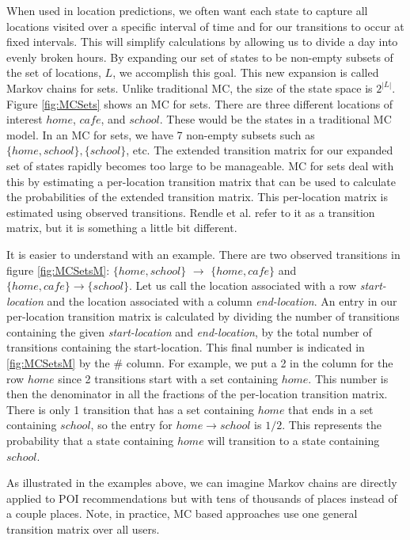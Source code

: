 \documentclass{sig-alternate}
\begin{document}
When used in location predictions, we often want each state to capture all locations visited over a specific interval of time 
and for our transitions to occur at fixed intervals. This will simplify calculations by allowing us to divide a day into evenly broken hours. 
By expanding our set of states to be non-empty subsets of the set of locations, $L$,  we accomplish this
goal. This new expansion is called Markov chains for sets. Unlike traditional MC, the size of the state space is $2^{|L|}$.
Figure \ref{fig:MCSets} shows an MC for sets. There are three different locations of interest $home$, $cafe$, and $school$. 
These would be the states in a traditional MC model. In an MC for sets, we have 7 non-empty subsets such as $\{home,school\}, \{school\}$, etc.
The extended transition matrix for our expanded set of states rapidly becomes too large to be manageable. 
MC for sets deal with this by estimating a per-location transition matrix that can be used to calculate the probabilities of the extended transition matrix.  
This per-location matrix is estimated using observed transitions. 
Rendle et al. \cite{Rendle:2010:FPM} refer to it as a transition matrix, but it is something a little bit different.

It is easier to understand with an example. 
There are two observed transitions in figure \ref{fig:MCSetsM}: $\{home,school\}$ $\rightarrow$ $\{home,cafe\}$ and 
$\{home,cafe\} \rightarrow \{school\}$.  
Let us call the location associated with a row \emph{start-location} and the location associated with a column \emph{end-location}. 
An entry in our per-location transition matrix is calculated by dividing the number of transitions containing the given \emph{start-location} and 
\emph{end-location}, by the total number of transitions containing the start-location. 
This final number is indicated in \ref{fig:MCSetsM} by the \# column.  
For example, we put a 2 in the column for the row $home$ since 2 transitions start with a set containing $home$. 
This number is then the denominator in all the fractions of the per-location transition matrix. 
There is only 1 transition that has a set containing $home$ that ends in a set containing $school$, 
so the entry for $home \rightarrow school$ is $1/2$.  
This represents the probability that a state containing $home$ will transition to a state containing $school$.

As illustrated in the examples above, we can imagine Markov chains are directly applied to 
POI recommendations but with tens of thousands of places instead of a couple places. Note, in practice, MC based 
approaches use one general transition matrix over all users.
\end{document}
